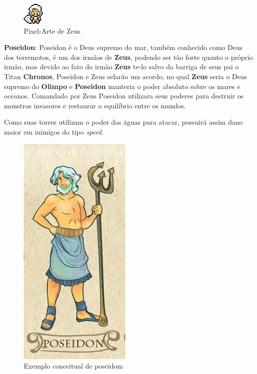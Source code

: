 \documentclass[11pt]{article} %
\begin{document}
\begin{figure}[!htp]
\centering
\includegraphics[scale=2]{res/characters/zeus_panel.png}
\caption{Pixel-Arte de Zeus}
\label{zeus}
\end{figure}

\newpage

{\large \textbf{Poseidon}}: Poseidon é o Deus supremo do mar, também conhecido como Deus dos terremotos, é um dos irmãos de \textbf{Zeus}, podendo ser tão forte quanto o próprio irmão, mas devido ao fato do irmão \textbf{Zeus} te-lo salvo da barriga de seus pai o Titan \textbf{Chronos}, Poseidon e Zeus selarão um acordo, no qual \textbf{Zeus} seria o Deus supremo do \textbf{Olimpo} e \textbf{Poseidon} manteria o poder absoluto sobre os mares e oceanos. Comandado por Zeus Poseidon utilizara seus poderes para destruir os monstros invasores e restaurar o equilíbrio entre os mundos.

Como suas torres utilizam o poder das águas para atacar, possuirá assim dano maior em  inimigos do tipo \textit{speed}.

\begin{figure}[!htp]
\centering
\includegraphics[scale=0.25]{res/characters/poseidom.png}
\caption{Exemplo conceitual de poseidom}
\label{poseidom}
\end{figure}
\end{document}
